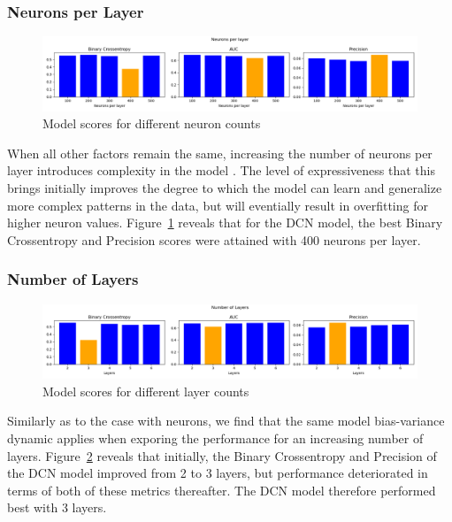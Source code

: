 \documentclass{mldsmsc}
\begin{document}
\subsubsection{Neurons per Layer}
\begin{figure}[h]
    \centering
    \includegraphics[width=\textwidth]{../figures/neurons.png}
    \caption{Model scores for different neuron counts}
    \label{fig:neurons}
\end{figure}

When all other factors remain the same, increasing the number of neurons per layer introduces
complexity in the model \citep{RefWorks:wang2017deep}. The level of expressiveness that this brings
initially improves the degree to which the model can learn and generalize more complex patterns in the data, 
but will eventially result in overfitting for higher neuron values. Figure~\ref{fig:neurons} reveals
that for the DCN model, the best Binary Crossentropy and Precision scores were attained with 400 neurons
per layer.

\subsubsection{Number of Layers}
\begin{figure}[h]
    \centering
    \includegraphics[width=\textwidth]{../figures/layers.png}
    \caption{Model scores for different layer counts}
    \label{fig:layers}
\end{figure}

Similarly as to the case with neurons, we find that the same model bias-variance dynamic
applies when exporing the performance for an increasing number of layers. Figure~\ref{fig:layers}
reveals that initially, the Binary
Crossentropy and Precision of the DCN model improved from 2 to 3 layers, but performance
deteriorated in terms of both of these metrics thereafter. The DCN model therefore performed
best with 3 layers.
\end{document}
